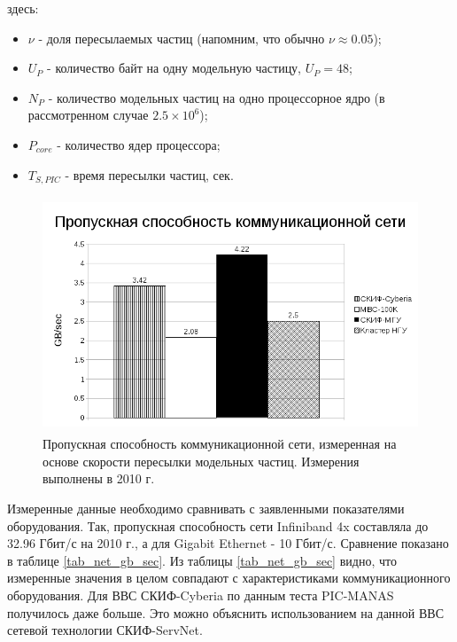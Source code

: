 здесь:
\begin{itemize}
	\item $\nu$ - доля пересылаемых частиц (напомним, что обычно $\nu \approx 0.05$);
	\item $U_P$ - количество байт на одну модельную частицу, $U_P = 48$;
	\item $N_P$ - количество модельных частиц на одно процессорное ядро (в рассмотренном случае $2.5\times 10^6$);  
	\item $P_{core}$ - количество ядер процессора;
	\item $T_{S,PIC}$  - время пересылки частиц, сек.
\end{itemize}	



\begin{figure}[htb]
	\begin{center}
		\includegraphics[height=7cm,keepaspectratio]{images/network_throughput_GB_sec.png}
	\end{center}
	\caption{Пропускная способность коммуникационной сети, измеренная на основе скорости пересылки модельных частиц. Измерения выполнены в 2010 г.}
	\label{plot_net_gb_sec}
\end{figure} 

Измеренные данные необходимо сравнивать с заявленными показателями оборудования. Так, пропускная способность сети Infiniband 4x составляла до 32.96 Гбит/с на 2010 г.,  а для Gigabit Ethernet - 10 Гбит/с. Сравнение показано в таблице  \ref{tab_net_gb_sec}. Из таблицы  \ref{tab_net_gb_sec} видно, что измеренные значения в целом совпадают с характеристиками коммуникационного оборудования. Для ВВС СКИФ-Cyberia по данным теста PIC-MANAS получилось даже больше. Это можно объяснить использованием на данной ВВС сетевой технологии СКИФ-ServNet. 

